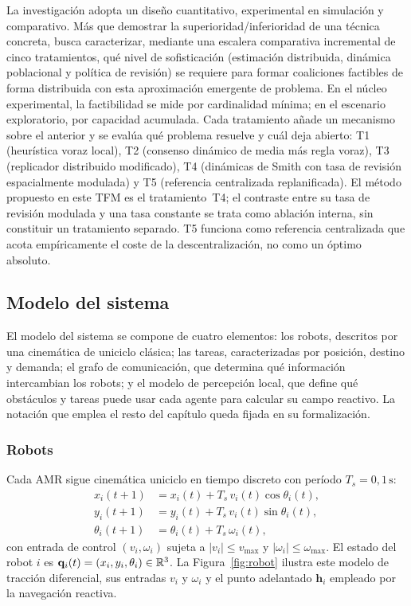 La investigación adopta un diseño cuantitativo, experimental en simulación y
comparativo. Más que demostrar la superioridad/inferioridad de una técnica concreta, busca
caracterizar, mediante una escalera comparativa incremental de cinco tratamientos,
qué nivel de sofisticación (estimación distribuida, dinámica poblacional y política
de revisión) se requiere para formar coaliciones factibles de forma distribuida con esta aproximación emergente de problema. En el
núcleo experimental, la factibilidad se mide por cardinalidad mínima; en el escenario
exploratorio, por capacidad acumulada. Cada tratamiento
añade un mecanismo sobre el anterior y se evalúa qué problema resuelve y cuál
deja abierto: T1 (heurística voraz local), T2 (consenso dinámico de media más
regla voraz), T3 (replicador distribuido modificado), T4 (dinámicas de Smith con
tasa de revisión espacialmente modulada) y T5 (referencia centralizada
replanificada). El método propuesto en este TFM es el tratamiento~T4; el
contraste entre su tasa de revisión modulada y una tasa constante se trata como
ablación interna, sin constituir un tratamiento separado. T5 funciona como
referencia centralizada que acota empíricamente el coste de la descentralización,
no como un óptimo absoluto.

\subsection{Modelo del sistema}

El modelo del sistema se compone de cuatro elementos: los robots, descritos por una
cinemática de uniciclo clásica; las tareas, caracterizadas por posición, destino y demanda; el
grafo de comunicación, que determina qué información intercambian los robots; y el
modelo de percepción local, que define qué obstáculos y tareas puede usar cada agente
para calcular su campo reactivo. La notación que emplea el resto del capítulo queda
fijada en su formalización.

\subsubsection{Robots}

Cada AMR sigue cinemática uniciclo en tiempo discreto con período $T_s = 0{,}1\,\text{s}$:
\begin{align}
  x_i(t+1) &= x_i(t) + T_s \, v_i(t)\cos\theta_i(t), \label{eq:unicycle_x}\\
  y_i(t+1) &= y_i(t) + T_s \, v_i(t)\sin\theta_i(t), \label{eq:unicycle_y}\\
  \theta_i(t+1) &= \theta_i(t) + T_s \, \omega_i(t), \label{eq:unicycle_theta}
\end{align}
con entrada de control $(v_i, \omega_i)$ sujeta a $|v_i| \leq v_{\max}$ y
$|\omega_i| \leq \omega_{\max}$. El estado del robot $i$ es
$\mathbf{q}_i(t) = (x_i, y_i, \theta_i) \in \mathbb{R}^3$. La Figura~\ref{fig:robot}
ilustra este modelo de tracción diferencial, sus entradas $v_i$ y $\omega_i$ y el
punto adelantado $\mathbf{h}_i$ empleado por la navegación reactiva.

